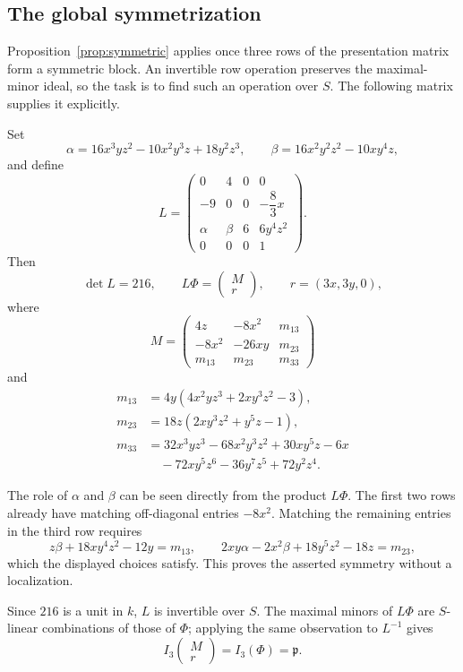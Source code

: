 \documentclass[11pt]{amsart}
\theoremstyle{remark}
\begin{document}
\subsection{The global symmetrization}

Proposition~\ref{prop:symmetric} applies once three rows of the presentation matrix form a symmetric block. An invertible row operation preserves the maximal-minor ideal, so the task is to find such an operation over $S$. The following matrix supplies it explicitly.

Set
\[
 \alpha=16x^3yz^2-10x^2y^3z+18y^2z^3,
 \qquad \beta=16x^2y^2z^2-10xy^4z,
\]
and define
\begin{equation}\label{eq:L}
 L=\begin{pmatrix}
 0&4&0&0\\
 -9&0&0&-\dfrac83x\\
 \alpha&\beta&6&6y^4z^2\\
 0&0&0&1
 \end{pmatrix}.
\end{equation}
Then
\[
 \det L=216,\qquad
 L\Phi=\begin{pmatrix}M\\r\end{pmatrix},\qquad
 r=(3x,3y,0),
\]
where
\begin{equation}\label{eq:M}
 M=\begin{pmatrix}
 4z&-8x^2&m_{13}\\
 -8x^2&-26xy&m_{23}\\
 m_{13}&m_{23}&m_{33}
 \end{pmatrix}
\end{equation}
and
\begin{align*}
 m_{13}&=4y(4x^2yz^3+2xy^3z^2-3),\\
 m_{23}&=18z(2xy^3z^2+y^5z-1),\\
 m_{33}&=32x^3yz^3-68x^2y^3z^2+30xy^5z-6x\\
       &\hspace{1em}-72xy^5z^6-36y^7z^5+72y^2z^4.
\end{align*}

The role of $\alpha$ and $\beta$ can be seen directly from the product $L\Phi$. The first two rows already have matching off-diagonal entries $-8x^2$. Matching the remaining entries in the third row requires
\[
 z\beta+18xy^4z^2-12y=m_{13},\qquad
 2xy\alpha-2x^2\beta+18y^5z^2-18z=m_{23},
\]
which the displayed choices satisfy. This proves the asserted symmetry without a localization.

Since $216$ is a unit in $k$, $L$ is invertible over $S$. The maximal minors of $L\Phi$ are $S$-linear combinations of those of $\Phi$; applying the same observation to $L^{-1}$ gives
\begin{equation}\label{eq:minor-ideal}
 I_3\!\begin{pmatrix}M\\r\end{pmatrix}=I_3(\Phi)=\mathfrak p.
\end{equation}
\end{document}
